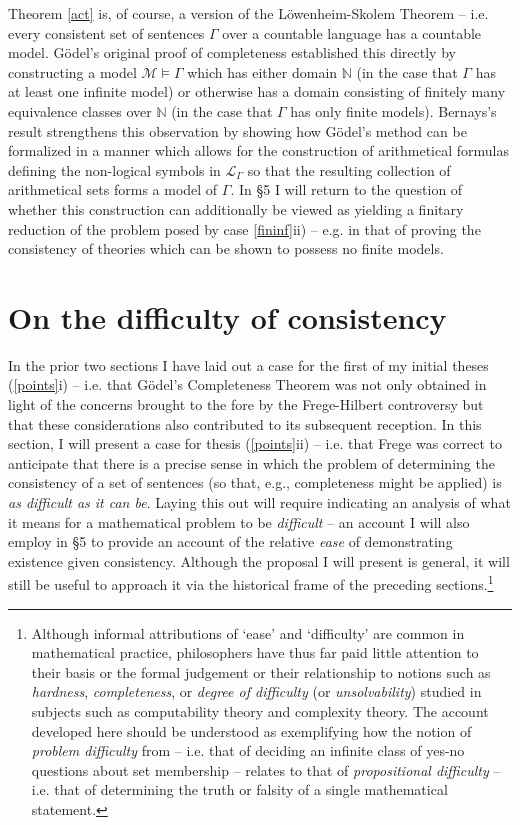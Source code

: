 \documentclass[11pt,fleqn,leqno]{article}
\begin{document}
Theorem \ref{act} is, of course, a version of the L\"owenheim-Skolem Theorem -- i.e. every consistent set of sentences $\Gamma$ over a countable language has a countable model.  G\"odel's \citeyearpar{Godel1929a} original proof of completeness established this directly by constructing a model $\mathcal{M} \models \Gamma$ which has either domain $\mathbb{N}$ (in the case that $\Gamma$ has at least one infinite model) or otherwise has a domain consisting of finitely many equivalence classes over $\mathbb{N}$ (in the case that $\Gamma$ has only finite models).   Bernays's result strengthens this observation by showing how G\"odel's method can be formalized in a manner which allows for the construction of arithmetical formulas defining the non-logical symbols in $\mathcal{L}_{\Gamma}$ so that the resulting collection of arithmetical sets forms a model of $\Gamma$.   In \S 5 I will return to the question of whether this construction can additionally be viewed as yielding a finitary reduction of the problem posed by case \ref{fininf}ii) -- e.g. in that of proving the consistency of theories which can be shown to possess no finite models.

\section{On the difficulty of consistency}

In the prior two sections I have laid out a case for the first of my initial theses (\ref{points}i) -- i.e. that G\"odel's Completeness Theorem was not only obtained in light of the concerns brought to the fore by the Frege-Hilbert controversy but that these considerations also contributed to its subsequent reception.   In this section, I will present a case for thesis (\ref{points}ii) -- i.e. that Frege was correct to anticipate that there is a precise sense in which the problem of determining the consistency of a set of sentences (so that, e.g., completeness might be applied) is \textsl{as difficult as it can be}.   Laying this out will require indicating an analysis of what it means for a mathematical problem to be \textsl{difficult} -- an account I will also employ in \S 5 to provide an account of the relative \textsl{ease} of demonstrating existence given consistency. Although the proposal I will present is general,  it will still be useful to approach it via the historical frame of the preceding sections.\footnote{Although informal attributions of `ease' and `difficulty' are common in mathematical practice, philosophers have thus far paid little attention to their basis or the formal judgement or their relationship to notions such as \textsl{hardness}, \textsl{completeness}, or \textsl{degree of difficulty} (or \textsl{unsolvability}) studied in subjects such as computability theory and complexity theory.    The account developed here should be understood as exemplifying how the notion of \textsl{problem difficulty} from \citep{Dean2019c} -- i.e. that of deciding an infinite class of yes-no questions about set membership -- relates to that of \textsl{propositional difficulty} -- i.e. that of determining the truth or falsity of a single mathematical statement.} 
\end{document}
